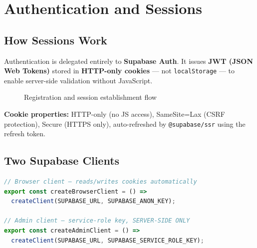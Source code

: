 \documentclass[12pt,a4paper]{report}
\begin{document}
\chapter{Authentication and Sessions}

\section{How Sessions Work}

Authentication is delegated entirely to \textbf{Supabase Auth}. It issues \textbf{JWT (JSON Web Tokens)} stored in \textbf{HTTP-only cookies} --- not \texttt{localStorage} --- to enable server-side validation without JavaScript.

\begin{figure}[H]\centering
{}
\caption{Registration and session establishment flow}
\end{figure}

\textbf{Cookie properties:} HTTP-only (no JS access), SameSite=Lax (CSRF protection), Secure (HTTPS only), auto-refreshed by \texttt{@supabase/ssr} using the refresh token.

\section{Two Supabase Clients}

\begin{lstlisting}[language=TypeScript,caption={src/lib/supabase.ts}]
// Browser client — reads/writes cookies automatically
export const createBrowserClient = () =>
  createClient(SUPABASE_URL, SUPABASE_ANON_KEY);

// Admin client — service-role key, SERVER-SIDE ONLY
export const createAdminClient = () =>
  createClient(SUPABASE_URL, SUPABASE_SERVICE_ROLE_KEY);
\end{lstlisting}
\end{document}
